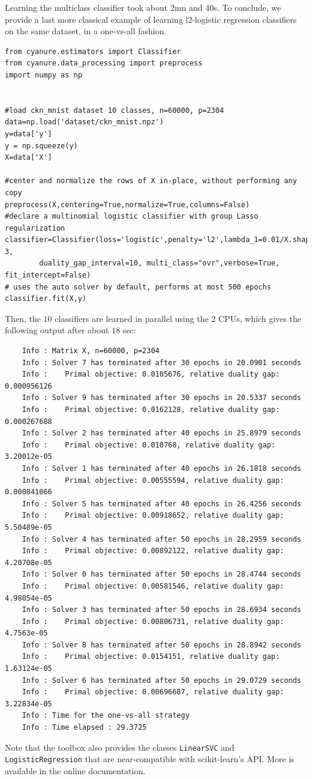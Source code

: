 \documentclass{article}
\begin{document}
Learning the multiclass classifier took about 2mn and 40s. To conclude, we provide a last more classical example
of learning l2-logistic regression classifiers on the same dataset, in a one-vs-all fashion.
\begin{verbatim}
from cyanure.estimators import Classifier
from cyanure.data_processing import preprocess
import numpy as np


#load ckn_mnist dataset 10 classes, n=60000, p=2304
data=np.load('dataset/ckn_mnist.npz')
y=data['y']
y = np.squeeze(y)
X=data['X']

#center and normalize the rows of X in-place, without performing any copy
preprocess(X,centering=True,normalize=True,columns=False)
#declare a multinomial logistic classifier with group Lasso regularization
classifier=Classifier(loss='logistic',penalty='l2',lambda_1=0.01/X.shape[0],max_iter=500,tol=1e-3,
        duality_gap_interval=10, multi_class="ovr",verbose=True, fit_intercept=False)
# uses the auto solver by default, performs at most 500 epochs
classifier.fit(X,y) 
\end{verbatim}
Then, the $10$ classifiers are learned in parallel using the 2 CPUs, which gives the following output after about $18$ sec:
\begin{verbatim}
    Info : Matrix X, n=60000, p=2304
    Info : Solver 7 has terminated after 30 epochs in 20.0901 seconds
    Info :    Primal objective: 0.0105676, relative duality gap: 0.000956126
    Info : Solver 9 has terminated after 30 epochs in 20.5337 seconds
    Info :    Primal objective: 0.0162128, relative duality gap: 0.000267688
    Info : Solver 2 has terminated after 40 epochs in 25.8979 seconds
    Info :    Primal objective: 0.010768, relative duality gap: 3.20012e-05
    Info : Solver 1 has terminated after 40 epochs in 26.1818 seconds
    Info :    Primal objective: 0.00555594, relative duality gap: 0.000841066
    Info : Solver 5 has terminated after 40 epochs in 26.4256 seconds
    Info :    Primal objective: 0.00918652, relative duality gap: 5.50489e-05
    Info : Solver 4 has terminated after 50 epochs in 28.2959 seconds
    Info :    Primal objective: 0.00892122, relative duality gap: 4.20708e-05
    Info : Solver 0 has terminated after 50 epochs in 28.4744 seconds
    Info :    Primal objective: 0.00581546, relative duality gap: 4.98054e-05
    Info : Solver 3 has terminated after 50 epochs in 28.6934 seconds
    Info :    Primal objective: 0.00806731, relative duality gap: 4.7563e-05
    Info : Solver 8 has terminated after 50 epochs in 28.8942 seconds
    Info :    Primal objective: 0.0154151, relative duality gap: 1.63124e-05
    Info : Solver 6 has terminated after 50 epochs in 29.0729 seconds
    Info :    Primal objective: 0.00696687, relative duality gap: 3.22834e-05
    Info : Time for the one-vs-all strategy
    Info : Time elapsed : 29.3725
\end{verbatim}
Note that the toolbox also provides the classes \texttt{LinearSVC} and \texttt{LogisticRegression} that are near-compatible with scikit-learn's API. More is available in the online documentation.
\end{document}
